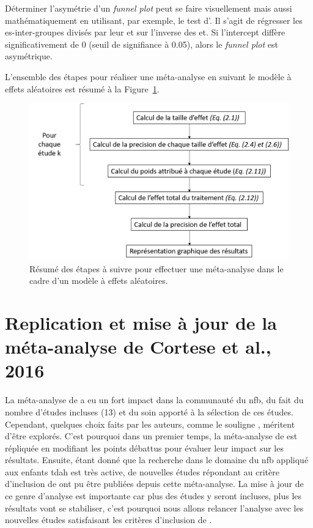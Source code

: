 Déterminer l'asymétrie d'un \textit{funnel plot} peut se faire visuellement mais aussi mathématiquement en utilisant, par exemple, le test d'\citet{Egger1997}. 
Il s'agit de régresser les \gls{es}-inter-groupes divisés par leur \gls{et} sur l'inverse des \gls{et}. Si l'intercept diffère significativement de 
0 (seuil de signifiance à 0.05), alors le \textit{funnel plot} est asymétrique.

L'ensemble des étapes pour réaliser une méta-analyse en suivant le modèle à effets aléatoires est résumé à la Figure~\ref{Figure:pipeline_meta_analyse}.

\begin{figure}[h!]
  \centering
	\includegraphics[width=1.0\linewidth]{figures/chapter-2/pipeline-perform-meta-analysis} 
  \caption{Résumé des étapes à suivre pour effectuer une méta-analyse dans le cadre d'un modèle à effets aléatoires.}
  \label{Figure:pipeline_meta_analyse}
\end{figure}

\section{Replication et mise à jour de la méta-analyse de Cortese et al., 2016} 

La méta-analyse de \citet{Cortese2016} a eu un fort impact dans la communauté du \gls{nfb}, du fait du nombre d'études incluses (13) et 
du soin apporté à la sélection de ces études. Cependant, quelques choix faits par les auteurs, comme le souligne \citet{Micoulaud2016}, méritent d'être explorés.
C'est pourquoi dans un premier temps, la méta-analyse de \citet{Cortese2016} est répliquée en modifiant les points débattus pour évaluer leur impact sur les
résultats. Ensuite, étant donné que la recherche dans le domaine du \gls{nfb} appliqué aux enfants \gls{tdah} est très active, de nouvelles études répondant au 
critère d'inclusion de \citet{Cortese2016} ont pu être publiées depuis cette méta-analyse. La mise à jour de ce genre d'analyse est importante
car plus des études y seront incluses, plus les résultats vont se stabiliser, c'est pourquoi nous allons relancer l'analyse avec les nouvelles études
satisfaisant les critères d'inclusion de \citet{Cortese2016}.

